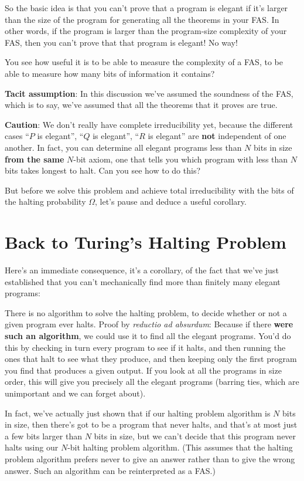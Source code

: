 \documentclass[12pt]{book}
\begin{document}
So the basic idea is that you can't prove that a program is elegant if it's
larger than the size of the program for generating all the theorems in your FAS.
In other words, if the program is larger than the program-size complexity of your FAS,
then you can't prove that that program is elegant!
No way!
 
You see how useful it is to be able to measure the complexity of a FAS, to be able to
measure how many bits of information it contains?
 
\textbf{Tacit assumption}: In this discussion we've assumed the soundness of the FAS, which is to
say, we've assumed that all the theorems that it proves are true.
 
\textbf{Caution}: We don't really have complete irreducibility yet, because the different cases
``$P$ is elegant'', ``$Q$ is elegant'', ``$R$ is elegant'' are \textbf{not} independent of one another.
In fact, you can determine all elegant programs less than $N$ bits in size 
\textbf{from the same} $N$-bit axiom, one that tells you which program with less than $N$
bits takes longest to halt.
Can you see how to do this?
 
But before we solve this problem and achieve total irreducibility with the bits of
the halting probability $\Omega$, let's pause and
deduce a useful corollary.

\section*{Back to Turing's Halting Problem}
 
Here's an immediate consequence, it's a corollary, of the fact that we've just established
that you can't mechanically find more than finitely many elegant programs:
 
There is no algorithm to solve the halting problem, to decide whether or not a given
program ever halts. 
Proof by \emph{reductio ad absurdum}:
Because if there \textbf{were such an algorithm}, we could use it to find all the elegant programs.
You'd do this by checking in turn every program to see if it halts, and then running
the ones that halt to see what they produce, and then keeping only the first program
you find that produces a given output.  If you look at all the programs in size order,
this will give you precisely all the elegant programs (barring ties, which are unimportant
and we can forget about).
 
In fact, we've 
actually just
shown that if 
our halting problem algorithm is
$N$ bits in size,
then there's got to be a program that never halts, 
and that's at most just a few bits larger than $N$ bits in size,
but we can't decide that this program never halts using our $N$-bit halting problem algorithm.
(This assumes that the halting problem algorithm prefers never to give an answer rather than to give
the wrong answer. Such an algorithm can be reinterpreted as a FAS.)
 
\end{document}
